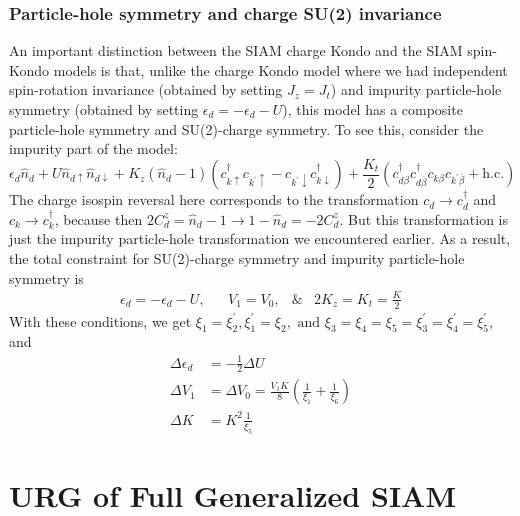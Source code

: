 \documentclass[twoside,11pt]{report}
\numberwithin{equation}{section}
\begin{document}
\subsection{Particle-hole symmetry and charge SU(2) invariance}
An important distinction between the SIAM charge Kondo and the SIAM spin-Kondo models is that, unlike the charge Kondo model where we had independent spin-rotation invariance (obtained by setting \(J_z = J_t\)) and impurity particle-hole symmetry (obtained by setting \(\epsilon_d = -\epsilon_d - U\)), this model has a composite particle-hole symmetry and SU(2)-charge symmetry. To see this, consider the impurity part of the model:
\begin{equation}
	\epsilon_d \hat n_d + U \hat n_{d\uparrow}\hat n_{d\downarrow} + K_z \left(\hat n_d - 1\right)\left(c^\dagger_{k\uparrow}c_{k^\prime\uparrow} - c_{k^\prime\downarrow}c^\dagger_{k\downarrow}\right) + \frac{K_t}{2}\left(c^\dagger_{d\beta}c^\dagger_{d\overline\beta}c_{k\beta}c_{k^\prime\overline\beta} + \text{h.c.}\right)
\end{equation}
The charge isospin reversal here corresponds to the transformation \(c_d \to c^\dagger_d\) and \(c_k \to c^\dagger_k\), because then \(2C^z_d = \hat n_d - 1 \to 1 - \hat n_d = -2C^z_d\). But this transformation is just the impurity particle-hole transformation we encountered earlier. As a result, the total constraint for SU(2)-charge symmetry and impurity particle-hole symmetry is
\begin{equation}\begin{aligned}
	\label{symm-charge}
	\epsilon_d = -\epsilon_d - U, && V_1 = V_0, &\& & 2K_z = K_t = \frac{K}{2} 
\end{aligned}\end{equation}
With these conditions, we get \(\xi_1 = \xi_2^\prime, \xi_1^\prime = \xi_2, \text{ and }\xi_3 = \xi_4 = \xi_5 = \xi_3^\prime = \xi_4^\prime = \xi_5^\prime\), and
\begin{equation}\begin{aligned}
	\Delta \epsilon_d &= -\frac{1}{2}\Delta U\\
	\Delta V_1 &= \Delta V_0 = \frac{V_1 K}{8}\left( \frac{1}{\xi_1} + \frac{1}{\xi_6} \right)\\
	\Delta K &= K^2 \frac{1}{\xi_5}
\end{aligned}\end{equation}

\chapter{URG of Full Generalized SIAM}
\label{fullurg}
\end{document}
